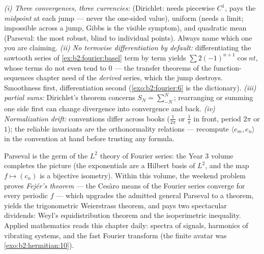 \begin{remark}
\emph{(i) Three convergences, three currencies:} 
(Dirichlet: needs piecewise $C^1$, pays the \emph{midpoint} at
each jump --- never the one-sided value), uniform (needs a
 limit; impossible across a jump, Gibbs is the
visible symptom), and quadratic mean (Parseval: the most
robust, blind to individual points). Always name which one you
are claiming. \emph{(ii) No termwise differentiation by
default:} differentiating the sawtooth series of
\cref{ex:b2:fourier:basel} term by term yields $\sum
2(-1)^{n+1}\cos nt$, whose terms do not even tend to $0$ ---
the transfer theorems of the function-sequences chapter need
 of the \emph{derived} series, which the
jump destroys. Smoothness first, differentiation second
(\cref{exo:b2:fourier:6} is the dictionary). \emph{(iii)
 partial sums:} Dirichlet's theorem concerns $S_N =
\sum_{-N}^{N}$; rearranging or summing one side first can
change divergence into convergence and back. \emph{(iv)
Normalization drift:} conventions differ across books
($\frac{1}{2\pi}$ or $\frac1\pi$ in front, period $2\pi$ or
$1$); the reliable invariants are the orthonormality relations
--- recompute $\langle e_m, e_n\rangle$ in the convention at
hand before trusting any formula.
\end{remark}

\begin{remark}
Parseval is the germ of the $L^2$ theory of Fourier series: the
Year 3 volume completes the picture (the exponentials are a
Hilbert basis of $L^2$, and the map $f \mapsto (c_n)$ is a
bijective isometry). Within this volume, the weekend problem
proves \emph{Fej\'er's theorem} --- the Ces\`aro means of the
Fourier series converge  for every  periodic
$f$ --- which upgrades the admitted general Parseval to a
theorem, yields the trigonometric Weierstrass theorem, and pays
two spectacular dividends: Weyl's equidistribution theorem and
the isoperimetric inequality. Applied mathematics reads this
chapter daily: spectra of signals, harmonics of vibrating
systems, and the fast Fourier transform (the finite avatar was
\cref{exo:b2:hermitian:10}).
\end{remark}

